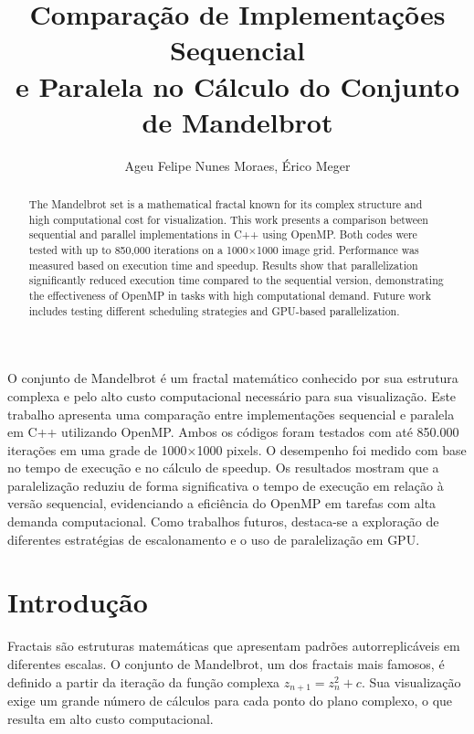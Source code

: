 \documentclass[12pt]{article}
\title{Comparação de Implementações Sequencial \\ e Paralela no Cálculo do Conjunto de Mandelbrot}
\author{Ageu Felipe Nunes Moraes\inst{1}, Érico Meger\inst{1}}
\begin{document}
 

\maketitle

\begin{abstract}
The Mandelbrot set is a mathematical fractal known for its complex structure and high computational cost for visualization. This work presents a comparison between sequential and parallel implementations in C++ using OpenMP. Both codes were tested with up to 850,000 iterations on a 1000×1000 image grid. Performance was measured based on execution time and speedup. Results show that parallelization significantly reduced execution time compared to the sequential version, demonstrating the effectiveness of OpenMP in tasks with high computational demand. Future work includes testing different scheduling strategies and GPU-based parallelization.
\end{abstract}
     
\begin{resumo} 
O conjunto de Mandelbrot é um fractal matemático conhecido por sua estrutura complexa e pelo alto custo computacional necessário para sua visualização. Este trabalho apresenta uma comparação entre implementações sequencial e paralela em C++ utilizando OpenMP. Ambos os códigos foram testados com até 850.000 iterações em uma grade de 1000×1000 pixels. O desempenho foi medido com base no tempo de execução e no cálculo de speedup. Os resultados mostram que a paralelização reduziu de forma significativa o tempo de execução em relação à versão sequencial, evidenciando a eficiência do OpenMP em tarefas com alta demanda computacional. Como trabalhos futuros, destaca-se a exploração de diferentes estratégias de escalonamento e o uso de paralelização em GPU.
\end{resumo}


\section{Introdução}

Fractais são estruturas matemáticas que apresentam padrões autorreplicáveis em diferentes escalas. O conjunto de Mandelbrot, um dos fractais mais famosos, é definido a partir da iteração da função complexa $z_{n+1} = z_{n}^{2} + c$. Sua visualização exige um grande número de cálculos para cada ponto do plano complexo, o que resulta em alto custo computacional\cite{omp:mandelbrot}.
\end{document}

